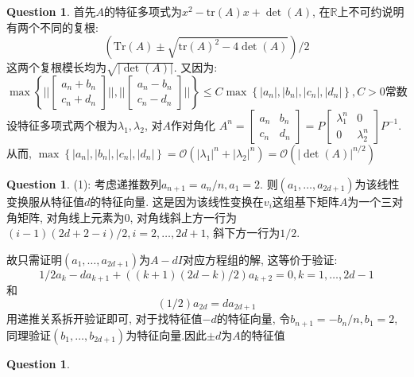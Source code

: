 \documentclass[12pt,a4paper]{ctexart}
\newcommand{\bbrace}[1]{\left\{ #1 \right\} }
\newcommand{\bb}[1]{\mathbb{#1}}
\theoremstyle{definition}
\newtheorem{ques}[defn]{Question}
\begin{document}
\begin{ques}
    首先$A$的特征多项式为$x^2-\text{tr}(A)x+\det(A)$, 在$\bb{R}$上不可约说明有两个不同的复根:
    \begin{equation*}
        (\text{Tr}(A)\pm \sqrt{\text{tr}(A)^2-4\det(A)})/2
    \end{equation*}
    这两个复根模长均为$\sqrt{|\det(A)|}$. 又因为:
    \begin{equation*}
        \max\bbrace{||\begin{bmatrix}
                a_n+b_n \\  c_n+d_n
            \end{bmatrix}||,||\begin{bmatrix}
                a_n-b_n \\  c_n-d_n
            \end{bmatrix}||
        }\le C\max\bbrace{|a_n|,|b_n|,|c_n|,|d_n|}, C>0\text{常数}
    \end{equation*}
    设特征多项式两个根为$\lambda_1,\lambda_2$, 对$A$作对角化
    $A^n=\begin{bmatrix}
            a_n & b_n \\
            c_n & d_n
        \end{bmatrix}=P\begin{bmatrix}
            \lambda_1^n & 0           \\
            0           & \lambda_2^n
        \end{bmatrix}P^{-1}$.
    从而,
    $\max\bbrace{|a_n|,|b_n|,|c_n|,|d_n|}=\mathcal{O}(|\lambda_1|^n+|\lambda_2|^n)=\mathcal{O}(|\det(A)|^{n/2}  )$










\end{ques}


\newpage
\begin{ques}
    (1): 考虑递推数列$a_{n+1}=a_n/n,a_1=2$. 则$(a_1,\dots,a_{2d+1})$为该线性变换服从特征值$d$的特征向量.
    这是因为该线性变换在$v_i$这组基下矩阵$A$为一个三对角矩阵, 对角线上元素为0, 对角线斜上方一行为$(i-1)(2d+2-i)/2,i=2,\dots,2d+1$, 斜下方一行为$1/2$.

    故只需证明$(a_1,\dots,a_{2d+1})$为$A-dI$对应方程组的解, 这等价于验证:
    \begin{equation*}
        1/2a_k-da_{k+1}+((k+1)(2d-k)/2)a_{k+2}=0, k=1,\dots,2d-1
    \end{equation*}
    和
    \begin{equation*}
        (1/2)a_{2d}=da_{2d+1}
    \end{equation*}
    用递推关系拆开验证即可, 对于找特征值$-d$的特征向量, 令$b_{n+1}=-b_n/n,b_1=2$, 同理验证$(b_1,\dots,b_{2d+1})$为特征向量.因此$\pm d$为$A$的特征值
\end{ques}
\newpage
\begin{ques}

\end{ques}
\end{document}
